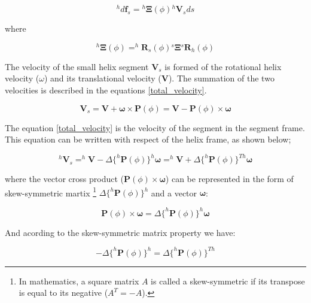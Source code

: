 \documentclass[12pt,a4paper,titlepage]{report}
\begin{document}
\begin{equation}
 ^{h}d\bm{f}_s = {^{h}\bm{\Xi}}(\phi){^{h}\bm{V}_s}{ds}
\label{velocity_force_helix_frame}
\end{equation}

where


\begin{equation}
{^{h}\bm{\Xi}}(\phi) = ^{h}\bm{R}_s(\phi){^{s}\bm{\Xi}}{^{s}\bm{R}_h(\phi)}
\label{drag_coeff_matrix_rotated}
\end{equation}

The velocity of the small helix segment $\bm{V}_s$ is formed of the rotational helix velocity ($\omega$) 
and its translational velocity ($\bm{V}$). The summation of the two velocities is described in the equations
\ref{total_velocity}.

\begin{equation}
\bm{V}_s = \bm{V} + \bm{\omega} \times {\bm{P}(\phi)} = \bm{V} - {\bm{P}(\phi)}\times{\bm{\omega}}
\label{total_velocity}
\end{equation}

The equation \ref{total_velocity} is the velocity of the segment in the segment frame. 
This equation can be written with respect of the helix frame, as shown below;

\begin{equation}
^{h}\bm{V}_s = ^{h}\bm{V} - \Delta{\{^{h}\bm{P}(\phi)}\}^{h}\bm{\omega} = ^{h}\bm{V} + \Delta{\{^{h}\bm{P}(\phi)}\}^{Th}\bm{\omega}
\label{total_velocity_helixFrame}
\end{equation}

where the vector cross product (${\bm{P}(\phi)}\times{\bm{\omega}}$) can be represented in the form 
of skew-symmetric
martix \footnote{In mathematics, a square matrix $A$ is called a skew-symmetric if its transpose
is equal to its negative ($A^{T} = -A$).} $\Delta{\{^{h}\bm{P}(\phi)}\}^{h}$ and a vector
$\bm{\omega}$:

\begin{equation}
{\bm{P}(\phi)}\times{\bm{\omega}} = \Delta{\{^{h}\bm{P}(\phi)}\}^{h}{\bm{\omega}}
\label{cross_product}
\end{equation}

And acording to the skew-symmetric matrix property we have:

\begin{equation}
-\Delta{\{^{h}\bm{P}(\phi)}\}^{h} = \Delta{\{^{h}\bm{P}(\phi)}\}^{Th}
\label{skew_symetric_vector}
\end{equation}
\end{document}
